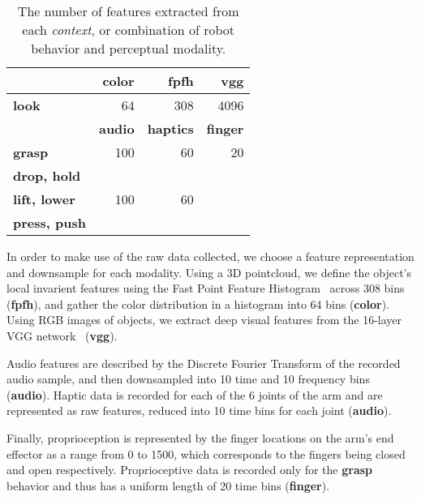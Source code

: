 

\begin{table}
\centering
\begin{tabular}[h]{|l|r|r|r|}
	\hline
	& \bf color & \bf fpfh & \bf vgg \\ \hline
	\bf look & 64 & 308 & 4096 \\ \hline \hline
	& \bf audio & \bf haptics & \bf finger \\ \hline
	\bf grasp & 100 & 60 & 20 \\ \hline
	\bf drop, hold & & & \\
	\bf lift, lower & 100 & 60 & \\
	\bf press, push & & & \\ \hline
\end{tabular}
\caption{The number of features extracted from each \textit{context}, or combination of robot behavior and perceptual modality.}
\label{tab:feature_space_of_contexts}
\end{table}

In order to make use of the raw data collected, we choose a feature representation and downsample for each modality.
Using a 3D pointcloud, we define the object's local invarient features using the Fast Point Feature Histogram~\cite{rusu:icra09}  across 308 bins (\textbf{fpfh}), and gather the color distribution in a histogram into 64 bins (\textbf{color}).
Using RGB images of objects, we extract deep visual features from the 16-layer VGG network~\cite{simonyan:corr14} (\textbf{vgg}).

Audio features are described by the Discrete Fourier Transform of the recorded audio sample, and then downsampled into 10 time and 10 frequency bins (\textbf{audio}). 
Haptic data is recorded for each of the 6 joints of the arm and are represented as raw features, reduced into 10 time bins for each joint (\textbf{audio}).

Finally, proprioception is represented by the finger locations on the arm's end effector as a range from 0 to 1500, which corresponds to the fingers being closed and open respectively. 
Proprioceptive data is recorded only for the \textbf{grasp} behavior and thus has a uniform length of 20 time bins (\textbf{finger}). 